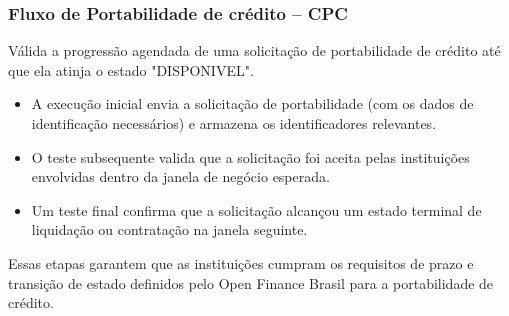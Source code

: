 \subsubsection{Fluxo de Portabilidade de crédito – CPC}
Válida a progressão agendada de uma solicitação de portabilidade de crédito até que ela atinja o estado "DISPONIVEL".
\begin{itemize}
    \item A execução inicial envia a solicitação de portabilidade (com os dados de identificação necessários) e armazena os identificadores relevantes.
    \item O teste subsequente valida que a solicitação foi aceita pelas instituições envolvidas dentro da janela de negócio esperada.
    \item Um teste final confirma que a solicitação alcançou um estado terminal de liquidação ou contratação na janela seguinte.
\end{itemize}
Essas etapas garantem que as instituições cumpram os requisitos de prazo e transição de estado definidos pelo Open Finance Brasil para a portabilidade de crédito.


